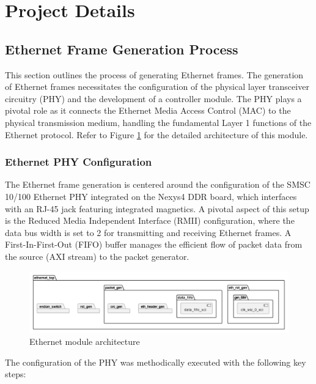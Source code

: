\section{Project Details}

\subsection{Ethernet Frame Generation Process}

This section outlines the process of generating Ethernet frames. The generation of Ethernet frames necessitates the configuration of the physical layer transceiver circuitry (PHY) and the development of a controller module. The PHY plays a pivotal role as it connects the Ethernet Media Access Control (MAC) to the physical transmission medium, handling the fundamental Layer 1 functions of the Ethernet protocol. Refer to Figure  \ref{fig:eth-mod-arch} for the detailed architecture of this module.


\subsubsection{Ethernet PHY Configuration}

The Ethernet frame generation is centered around the configuration of the SMSC 10/100 Ethernet PHY integrated on the Nexys4 DDR board, which interfaces with an RJ-45 jack featuring integrated magnetics. A pivotal aspect of this setup is the Reduced Media Independent Interface (RMII) configuration, where the data bus width is set to 2 for transmitting and receiving Ethernet frames. A First-In-First-Out (FIFO) buffer manages the efficient flow of packet data from the source (AXI stream) to the packet generator.
\begin{figure}
    \centering
    \includegraphics[width=1\linewidth]{Sections//IMPLEMENTATION//images/ModuleETH.png}
    \caption{Ethernet module architecture}
    \label{fig:eth-mod-arch}
\end{figure}
The configuration of the PHY was methodically executed with the following key steps:

